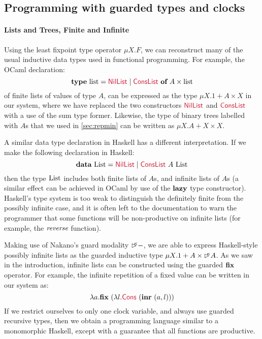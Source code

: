 \subsection{Programming with guarded types and clocks}
\label{sec:examples}

\paragraph{Lists and Trees, Finite and Infinite} Using the least
fixpoint type operator $\mu X. F$, we can reconstruct many of the
usual inductive data types used in functional programming. For
example, the OCaml declaration:
\begin{displaymath}
  \kw{type}~\tyname{list} = \cons{NilList} \mathrel| \cons{ConsList}~\kw{of}~A\times\tyname{list}
\end{displaymath}
of finite lists of values of type $A$, can be expressed as the type
$\mu X. 1 + A \times X$ in our system, where we have replaced the two
constructors $\cons{NilList}$ and $\cons{ConsList}$ with a use of the
sum type former. Likewise, the type of binary trees labelled with $A$s
that we used in \autoref{sec:repmin} can be written as $\mu X. A + X
\times X$.

A similar data type declaration in Haskell has a different
interpretation. If we make the following declaration in Haskell:
\begin{displaymath}
  \kw{data}~\tyname{List} = \cons{NilList} \mathrel| \cons{ConsList}~A~\tyname{List}
\end{displaymath}
then the type $\textrm{List}$ includes both finite lists of $A$s, and
infinite lists of $A$s (a similar effect can be achieved in OCaml by
use of the $\textbf{lazy}$ type constructor). Haskell's type system is too
weak to distinguish the definitely finite from the possibly infinite
case, and it is often left to the documentation to warn the programmer
that some functions will be non-productive on infinite lists (for
example, the $\textit{reverse}$ function).

Making use of Nakano's guard modality $\mathord{\rhd\kern-0.4em^{\kappa}}-$, we are able to
express Haskell-style possibly infinite lists as the guarded inductive
type $\mu X. 1 + A \times \mathord{\rhd\kern-0.4em^{\kappa}} A$. As we saw in the
introduction, infinite lists can be constructed using the guarded
$\textbf{fix}$ operator. For example, the infinite repetition of a fixed
value can be written in our system as:
\begin{displaymath}
  \lambda a. \kw{fix}~(\lambda l. \cons{Cons}~(\kw{inr}~(a,l)))
\end{displaymath}
If we restrict ourselves to only one clock variable, and always use
guarded recursive types, then we obtain a programming language similar
to a monomorphic Haskell, except with a guarantee that all functions
are productive.

